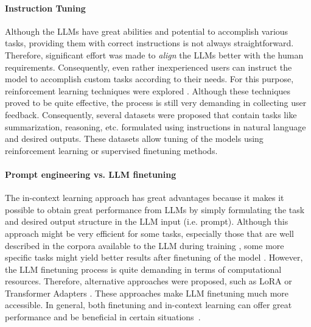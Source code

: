 \paragraph{Instruction Tuning}
Although the LLMs have great abilities and potential to accomplish various tasks, providing them with correct instructions is not always straightforward.
Therefore, significant effort was made to \emph{align} the LLMs better with the human requirements.
Consequently, even rather inexperienced users can instruct the model to accomplish custom tasks according to their needs.
For this purpose, reinforcement learning techniques were explored \cite{ziegler2019fine,ouyang2022training}.
Although these techniques proved to be quite effective, the process is still very demanding in collecting user feedback.
Consequently, several datasets were proposed \cite{supernaturalinstructions,black2022gpt} that contain tasks like summarization, reasoning, etc. formulated using instructions in natural language and desired outputs.
These datasets allow tuning of the models using reinforcement learning or supervised finetuning methods.

\paragraph{Prompt engineering vs. LLM finetuning}
The in-context learning approach has great advantages because it makes it possible to obtain great performance from LLMs by simply formulating the task and desired output structure in the LLM input (i.e. prompt).
Although this approach might be very efficient for some tasks, especially those that are well described in the corpora available to the LLM during training \cite{wei2022emergent}, some more specific tasks might yield better results after finetuning of the model \cite{tu-etal-2022-prompt}.
However, the LLM finetuning process is quite demanding in terms of computational resources.
Therefore, alternative approaches were proposed, such as LoRA \cite{hu2021lora} or Transformer Adapters \cite{pfeiffer2020AdapterHub}.
These approaches make LLM finetuning much more accessible.
In general, both finetuning and in-context learning can offer great performance and be beneficial in certain situations~\cite{mosbach-etal-2023-shot}.

